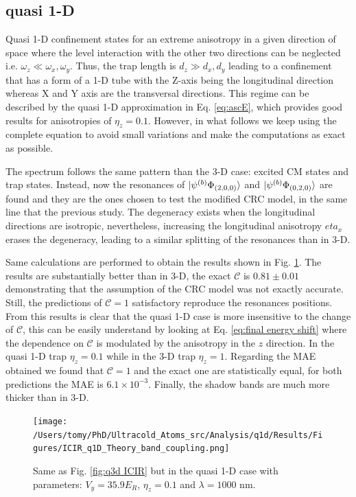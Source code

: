 \documentclass[aps,pre,twocolumn,superscriptaddress,showpacs]{revtex4-1}
\begin{document}
\subsection{quasi 1-D} \label{subsec:quasi 1-D}
Quasi 1-D confinement states for an extreme anisotropy in a given direction of space where the level interaction with the other two directions can be neglected i.e. $\omega_z \ll \omega_x, \omega_y$. Thus, the trap length is $d_z \gg d_x, d_y$ leading to a confinement that has a form of a 1-D tube with the Z-axis being the longitudinal direction whereas X and Y axis are the transversal directions. This regime can be described by the quasi 1-D approximation in Eq. \eqref{eq:ascE}, which provides good results for anisotropies of $\eta_z = 0.1$. However, in what follows we keep using the complete equation to avoid small variations and make the computations as exact as possible.

The spectrum follows the same pattern than the 3-D case: excited CM states and trap states. Instead, now the resonances of $\ket{ \psi^{(b)} \Phi_{(2,0,0)}} $ and $\ket{ \psi^{(b)} \Phi_{(0,2,0)}}$ are found and they are the ones chosen to test the modified CRC model, in the same line that the previous study. The degeneracy exists when the longitudinal directions are isotropic, nevertheless, increasing the longitudinal anisotropy $eta_x$ erases the degeneracy, leading to a similar splitting of the resonances than in 3-D.

Same calculations are performed to obtain the results shown in Fig. \ref{fig:q1D ICIR}. The results are substantially better than in 3-D, the exact $\mathcal{C}$ is $0.81 \pm 0.01$ demonstrating that the assumption of the CRC model was not exactly accurate. Still, the predictions of $\mathcal{C} = 1$ satisfactory reproduce the resonances positions. From this results is clear that the quasi 1-D case is more insensitive to the change of $\mathcal{C}$, this can be easily understand by looking at Eq. \eqref{eq:final energy shift} where the dependence on $\mathcal{C}$ is modulated by the anisotropy in the $z$ direction. In the quasi 1-D trap $\eta_z=0.1$ while in the 3-D trap $\eta_z=1$. Regarding the MAE obtained we found that $\mathcal{C}=1$ and the exact one are statistically equal, for both predictions the MAE is $6.1\times 10^{-3}$. Finally, the shadow bands are much more thicker than in 3-D.

\begin{figure}[htbp!]
   	 \centering
    	\texttt{[image: /Users/tomy/PhD/Ultracold\_Atoms\_src/Analysis/q1d/Results/Figures/ICIR\_q1D\_Theory\_band\_coupling.png]}
    	\caption{Same as Fig. \ref{fig:q3d ICIR} but in the quasi 1-D case with parameters: $V_y = 35.9E_R$, $\eta_z = 0.1$ and $\lambda=1000$ nm. }
    	\label{fig:q1D ICIR}
	\end{figure}
	
\end{document}
